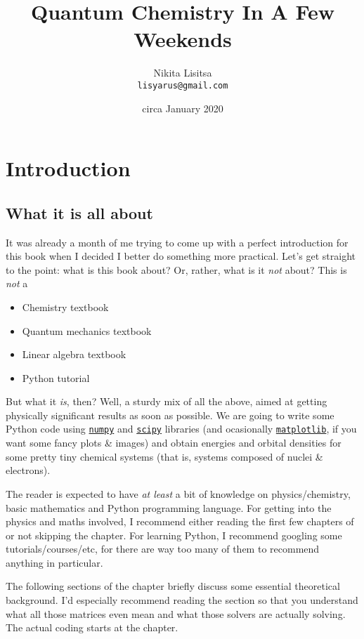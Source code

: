 \documentclass{book}
\title{Quantum Chemistry In A Few Weekends}
\author{Nikita Lisitsa \\ \texttt{lisyarus@gmail.com}}
\date{circa January 2020}
\begin{document}
\maketitle

\tableofcontents

\chapter{Introduction} \label{chap:intro}

\section{What it is all about}
It was already a month of me trying to come up with a perfect introduction for this book when I decided I better do something more practical. Let's get straight to the point: what is this book about? Or, rather, what is it \textit{not} about? This is \textit{not} a

\begin{itemize}
\item Chemistry textbook
\item Quantum mechanics textbook
\item Linear algebra textbook
\item Python tutorial
\end{itemize}

But what it \textit{is}, then? Well, a sturdy mix of all the above, aimed at getting physically significant results as soon as possible. We are going to write some Python code using \href{https://numpy.org}{\texttt{numpy}} and \href{https://www.scipy.org}{\texttt{scipy}} libraries (and ocasionally \href{https://matplotlib.org}{\texttt{matplotlib}}, if you want some fancy plots \& images) and obtain energies and orbital densities for some pretty tiny chemical systems (that is, systems composed of nuclei \& electrons).

The reader is expected to have \textit{at least} a bit of knowledge on physics/chemistry, basic mathematics and Python programming language. For getting into the physics and maths involved, I recommend either reading the first few chapters of \cite{ref:atkins} or not skipping the  chapter. For learning Python, I recommend googling some tutorials/courses/etc, for there are way too many of them to recommend anything in particular.

The following sections of the   chapter briefly discuss some essential theoretical background. I'd especially recommend reading the  section so that you understand what all those matrices even mean and what those solvers are actually solving. The actual coding starts at the  chapter.
\end{document}
